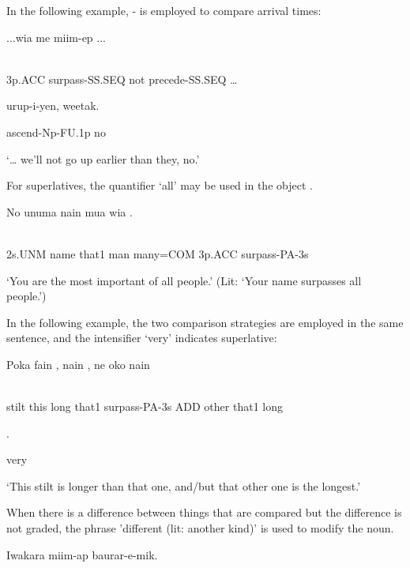 In the following example, - is employed to compare arrival times:

\ea%
\label{ex:x1895}
\gll ...wia    me  miim-ep  ... \\
      \\
\glt
\z

3p.ACC  surpass-SS.SEQ  not  precede-SS.SEQ  {\dots}  

urup-i-yen,  weetak.

ascend-Np-FU.1p  no

`{\dots} we'll not go up earlier than they, no.'

For superlatives, the quantifier  `all' may be used in the object .

\ea%
\label{ex:x1330}
\gll No  unuma  nain  mua    wia  . \\
      \\
\glt
\z

2s.UNM  name  that1  man  many=COM  3p.ACC  surpass-PA-3s

`You are the most important of all people.' (Lit: `Your name surpasses all people.')

In the following example, the two comparison strategies are employed in the same sentence, and the intensifier  `very' indicates superlative:

\ea%
\label{ex:x1337}
\gll Poka  fain  ,  nain  ,  ne  oko  nain   \\
      \\
\glt
\z

stilt  this  long  that1  surpass-PA-3s  ADD  other  that1  long

.

very

`This stilt is longer than that one, and/but that other one is the longest.'

When there is a difference between things that are compared but the difference is not graded, the phrase  'different (lit: another kind)' is used to modify the noun.

\ea%
\label{ex:x1334}
\gll Iwakara    miim-ap  baurar-e-mik. \\
      \\
\glt
\z

